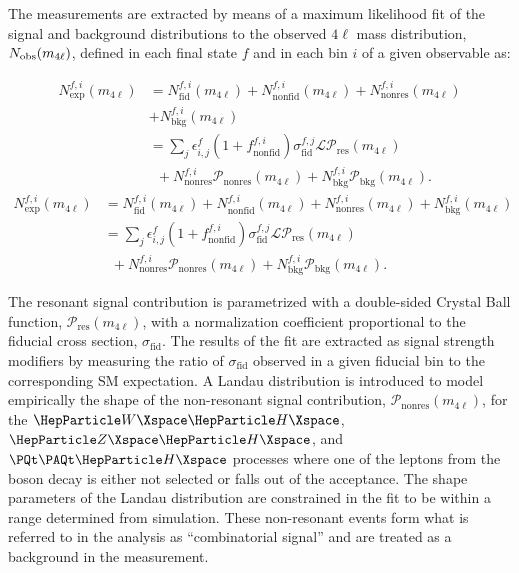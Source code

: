 The measurements are extracted by means of a maximum likelihood fit of the signal and background distributions to the observed $4\ell$
mass distribution, $N_{\mathrm{obs}}(m_{4\ell})$, defined in each final state $f$ and in each bin $i$ of a given observable as:

\begin{linenomath}
	{
		\begin{equation}
		\label{eqn:m4l}
		\begin{aligned}
		N_{\mathrm{exp}}^{f,i}(m_{4\ell}) &= N_{\mathrm{fid}}^{f,i}(m_{4\ell})+N_{\mathrm{nonfid}}^{f,i}(m_{4\ell})+N_{\mathrm{nonres}}^{f,i}(m_{4\ell})\\
		&+N_{\text{bkg}}^{f,i}(m_{4\ell}) \\
		&=\sum_j\epsilon_{i,j}^{f}  \left(1+f_{\mathrm{nonfid}}^{f,i} \right)\sigma_{\mathrm{fid}}^{f,j}  \mathcal{L}\mathcal{P}_{\mathrm{res}}(m_{4\ell}) \\
		&\,\,\,+ N_{\mathrm{nonres}}^{f,i}\mathcal{P}_{\mathrm{nonres}}(m_{4\ell})+N_{\text{bkg}}^{f,i}\mathcal{P}_{\text{bkg}}(m_{4\ell}).
		\end{aligned}
		\end{equation}
	}
	{
		\begin{equation}
		\label{eqn:m4l}
		\begin{aligned}
		N_{\mathrm{exp}}^{f,i}(m_{4\ell}) &= N_{\mathrm{fid}}^{f,i}(m_{4\ell})+N_{\mathrm{nonfid}}^{f,i}(m_{4\ell})+N_{\mathrm{nonres}}^{f,i}(m_{4\ell})+N_{\text{bkg}}^{f,i}(m_{4\ell}) \\
		&=\sum_j\epsilon_{i,j}^{f}  \left(1+f_{\mathrm{nonfid}}^{f,i} \right)\sigma_{\mathrm{fid}}^{f,j}  \mathcal{L}\mathcal{P}_{\mathrm{res}}(m_{4\ell}) \\
		&\,\,\,+ N_{\mathrm{nonres}}^{f,i}\mathcal{P}_{\mathrm{nonres}}(m_{4\ell})+N_{\text{bkg}}^{f,i}\mathcal{P}_{\text{bkg}}(m_{4\ell}).
		\end{aligned}
		\end{equation}
	}
\end{linenomath}

The resonant signal contribution is parametrized with a double-sided Crystal Ball function, $\mathcal{P}_{\mathrm{res}}(m_{4\ell})$, with a normalization coefficient proportional to the fiducial cross section, $\sigma_{\mathrm{fid}}$.
The results of the fit are extracted as signal strength modifiers by measuring the ratio of $\sigma_{\mathrm{fid}}$  observed in a given fiducial bin to the corresponding SM expectation.
A Landau distribution is introduced to model empirically the shape of the non-resonant signal contribution, $\mathcal{P}_{\mathrm{nonres}}(m_{4\ell})$, for the $\WH$, $\ZH$, and $\ttH$ processes where one of the leptons from the \PH boson decay is either not selected or falls out of the acceptance.
The shape parameters of the Landau distribution are constrained in the fit to be within a range determined from simulation.
These non-resonant events form what is referred to in the analysis as ``combinatorial signal'' and are treated as a background in the measurement.


